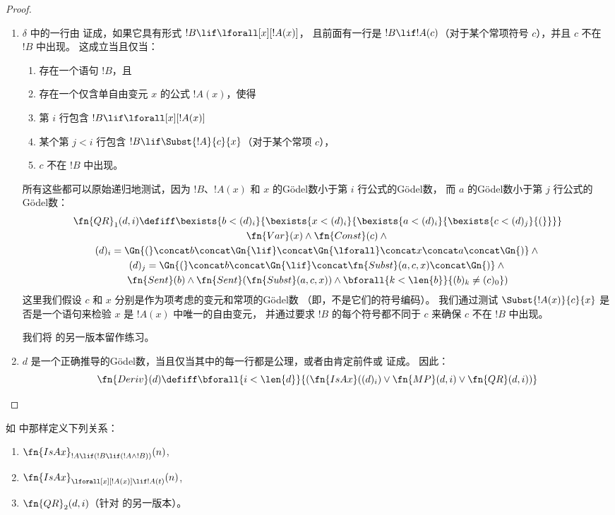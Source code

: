 \documentclass[../../../include/open-logic-section]{subfiles}
\begin{document}
\begin{proof}
\begin{enumerate}
\item $\delta$ 中的一行由 \QR{} 证成，如果它具有形式 $!B \lif \lforall[x][!A(x)]$，
  且前面有一行是 $!B \lif !A(c)$（对于某个常项符号 $c$），并且 $c$ 不在 $!B$ 中出现。
  这成立当且仅当：
  \begin{enumerate}
  \item 存在一个语句 $!B$，且
  \item 存在一个仅含单自由变元 $x$ 的公式 $!A(x)$，使得
  \item 第 $i$ 行包含 $!B \lif \lforall[x][!A(x)]$
  \item 某个第 $j < i$ 行包含 $!B \lif \Subst{!A}{c}{x}$（对于某个常项 $c$），
  \item $c$ 不在 $!B$ 中出现。
  \end{enumerate}
  所有这些都可以原始递归地测试，因为 $!B$、$!A(x)$ 和 $x$ 的Gödel数小于第 $i$ 行公式的Gödel数，
  而 $a$ 的Gödel数小于第 $j$ 行公式的Gödel数：
  \begin{multline*}
    \fn{QR}_1(d, i) \defiff \bexists{b < (d)_i}{\bexists{x <
        (d)_i}{\bexists{a < (d)_i}{\bexists{c < (d)_j}{(}}}}
    \\ \fn{Var}(x) \land \fn{Const}(c) \land {} \\
    (d)_i = \Gn{(} \concat
    b \concat \Gn{\lif} \concat \Gn{\lforall} \concat x \concat a
    \concat \Gn{)} \land {}\\
    (d)_j = \Gn{(} \concat b \concat
    \Gn{\lif} \concat \fn{Subst}(a,c,x) \concat \Gn{)} \land {}\\ \fn{Sent}(b)
    \land \fn{Sent}(\fn{Subst}(a,c,x)) \land {} \bforall{k <
      \len{b}}{(b)_k \neq (c)_0})
  \end{multline*}
  这里我们假设 $c$ 和 $x$ 分别是作为项考虑的变元和常项的Gödel数
  （即，不是它们的符号编码）。
  我们通过测试 $\Subst{!A(x)}{c}{x}$ 是否是一个语句来检验 $x$ 是 $!A(x)$ 中唯一的自由变元，
  并通过要求 $!B$ 的每个符号都不同于 $c$ 来确保 $c$ 不在 $!B$ 中出现。

  我们将 \QR{} 的另一版本留作练习。

\item $d$ 是一个正确推导的Gödel数，当且仅当其中的每一行都是公理，或者由肯定前件或 \QR{} 证成。
  因此：
  \[
  \fn{Deriv}(d) \defiff \bforall{i < \len{d}}{(\fn{IsAx}((d)_i) \lor
    \fn{MP}(d,i) \lor \fn{QR}(d, i))}
  \]
\end{enumerate}
\end{proof}

\begin{prob}
如  中那样定义下列关系：
\begin{enumerate}
\item $\fn{IsAx}_{!A \lif (!B \lif (!A \land !B))}(n)$,
\item $\fn{IsAx}_{\lforall[x][!A(x)] \lif !A(t)}(n)$,
\item $\fn{QR}_{2}(d, i)$（针对 \QR{} 的另一版本）。
\end{enumerate}
\end{prob}
\end{document}
